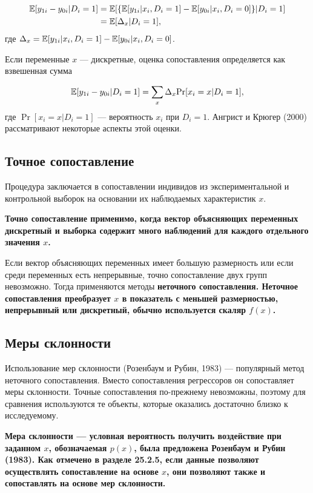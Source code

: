 \begin{align}
\label{eq25.38}
\mathbb{E} [y_{1i} - y_{0i} | D_i = 1] &= \mathbb{E}[ \{ \mathbb{E}[y_{1i} | x_i, D_i = 1] - \mathbb{E}[y_{0i} | x_i, D_i = 0] \} | D_i = 1 ]  \\
& = \mathbb{E} [\Delta_x | D_i = 1], \nonumber
\end{align}
где $\Delta_x = \mathbb{E} [y_{1i} | x_i, D_i = 1] - \mathbb{E}[y_{0i} | x_i, D_i = 0] $. 

Если переменные $x$ --- дискретные, оценка сопоставления определяется как взвешенная сумма

\begin{equation}
\label{eq25.39}
\mathbb{E} [y_{1i} - y_{0i} | D_i = 1] = \sum_x \Delta_x \mathrm{Pr} [x_i = x | D_i = 1],
\end{equation}
где $\Pr [x_i = x | D_i = 1]$ --- вероятность $x_i$ при $D_i = 1$. Ангрист и Крюгер (2000) рассматривают некоторые аспекты этой оценки. 

\subsection{Точное сопоставление}

Процедура заключается в сопоставлении индивидов из экспериментальной и контрольной выборок на основании их наблюдаемых характеристик $x$. 

\bfseries Точно сопоставление \mdseries применимо, когда вектор объясняющих переменных дискретный и выборка содержит много наблюдений для каждого отдельного значения $x$. 

Если вектор объясняющих переменных имеет большую размерность или если среди переменных есть непрерывные, точно сопоставление двух групп невозможно. Тогда применяются методы \bfseries неточного сопоставления. \mdseries Неточное сопоставления преобразует $x$ в показатель с меньшей размерностью, непрерывный или дискретный, обычно используется скаляр $f(x)$. 

\subsection{Меры склонности}

Использование мер склонности (Розенбаум и Рубин, 1983) --- популярный метод неточного сопоставления. Вместо сопоставления регрессоров он сопоставляет меры склонности. Точные сопоставления по-прежнему невозможны, поэтому для сравнения используются те объекты, которые оказались достаточно близко к исследуемому. 

\bfseries Мера склонности \mdseries --- условная вероятность получить воздействие при заданном $x$, обозначаемая $p(x)$, была предложена Розенбаум и Рубин (1983). Как отмечено в разделе 25.2.5, если данные позволяют осуществлять сопоставление на основе $x$, они позволяют также и сопоставлять на основе мер склонности. 

